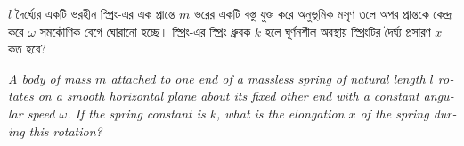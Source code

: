 \documentclass[12pt, a4paper]{article}
\begin{document}
\begin{tcolorbox}[questionbox={প্রশ্ন (Question) 29}]
\noindent
$l$ দৈর্ঘ্যের একটি ভরহীন স্প্রিং-এর এক প্রান্তে $m$ ভরের একটি বস্তু যুক্ত করে অনুভূমিক মসৃণ তলে অপর প্রান্তকে কেন্দ্র করে $\omega$ সমকৌণিক বেগে ঘোরানো হচ্ছে। স্প্রিং-এর স্প্রিং ধ্রুবক $k$ হলে ঘূর্ণনশীল অবস্থায় স্প্রিংটির দৈর্ঘ্য প্রসারণ $x$ কত হবে?

\vspace{0.8em}
\begin{english}
\noindent\textit{\color{darkgray}
A body of mass $m$ attached to one end of a massless spring of natural length $l$ rotates on a smooth horizontal plane about its fixed other end with a constant angular speed $\omega$. If the spring constant is $k$, what is the elongation $x$ of the spring during this rotation?
}
\end{english}
\end{tcolorbox}
\end{document}
